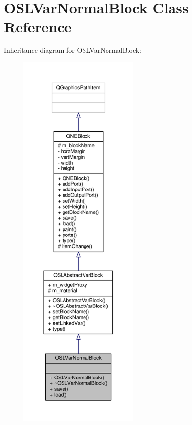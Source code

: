 \hypertarget{class_o_s_l_var_normal_block}{\section{O\-S\-L\-Var\-Normal\-Block Class Reference}
\label{class_o_s_l_var_normal_block}
}


Inheritance diagram for O\-S\-L\-Var\-Normal\-Block\-:
\nopagebreak
\begin{figure}[H]
\begin{center}
\leavevmode
\includegraphics[height=550pt]{class_o_s_l_var_normal_block__inherit__graph}
\end{center}
\end{figure}


